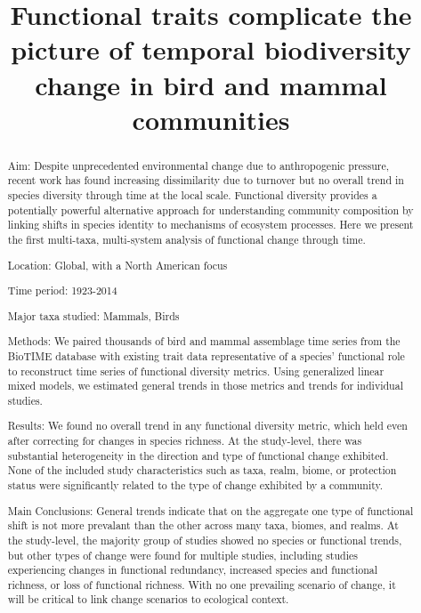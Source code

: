 \documentclass{article}
\title{Functional traits complicate the picture of temporal biodiversity
change in bird and mammal communities}
\author{
  }
\begin{document}
\maketitle


\begin{abstract}
Aim: Despite unprecedented environmental change due to anthropogenic
pressure, recent work has found increasing dissimilarity due to turnover
but no overall trend in species diversity through time at the local
scale. Functional diversity provides a potentially powerful alternative
approach for understanding community composition by linking shifts in
species identity to mechanisms of ecosystem processes. Here we present
the first multi-taxa, multi-system analysis of functional change through
time.

Location: Global, with a North American focus

Time period: 1923-2014

Major taxa studied: Mammals, Birds

Methods: We paired thousands of bird and mammal assemblage time series
from the BioTIME database with existing trait data representative of a
species' functional role to reconstruct time series of functional
diversity metrics. Using generalized linear mixed models, we estimated
general trends in those metrics and trends for individual studies.

Results: We found no overall trend in any functional diversity metric,
which held even after correcting for changes in species richness. At the
study-level, there was substantial heterogeneity in the direction and
type of functional change exhibited. None of the included study
characteristics such as taxa, realm, biome, or protection status were
significantly related to the type of change exhibited by a community.

Main Conclusions: General trends indicate that on the aggregate one type
of functional shift is not more prevalant than the other across many
taxa, biomes, and realms. At the study-level, the majority group of
studies showed no species or functional trends, but other types of
change were found for multiple studies, including studies experiencing
changes in functional redundancy, increased species and functional
richness, or loss of functional richness. With no one prevailing
scenario of change, it will be critical to link change scenarios to
ecological context.
\end{abstract}

\end{document}
